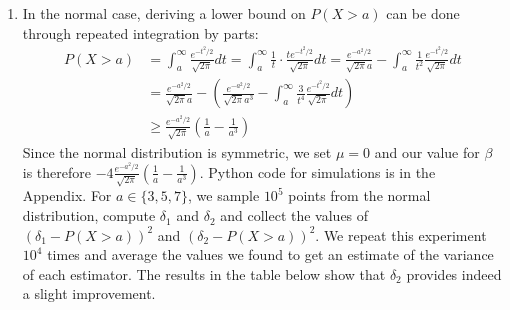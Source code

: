\documentclass[a4paper,11pt]{article}
\begin{document}
\begin{enumerate}[label=(\alph*)]
  \item In the normal case, deriving a lower bound on $P(X>a)$ can be done through repeated integration by parts: $$\begin{aligned}
    P(X>a)&= \int_a^\infty \frac{e^{-t^2/2}}{\sqrt{2 \pi}} dt = \int_a^\infty \frac 1t\cdot \frac{te^{-t^2/2}}{\sqrt{2 \pi}} dt = \frac{e^{-a^2/2}}{\sqrt{2 \pi}a} - \int_a^\infty \frac{1}{t^2} \frac{e^{-t^2/2}}{\sqrt{2 \pi}} dt\\
    &= \frac{e^{-a^2/2}}{\sqrt{2 \pi}a} - \left(\frac{e^{-a^2/2}}{\sqrt{2 \pi}a^3} -  \int_a^\infty \frac{3}{t^4} \frac{e^{-t^2/2}}{\sqrt{2 \pi}} dt\right)\\
    &\geq \frac{e^{-a^2/2}}{\sqrt{2 \pi}}\left(\frac 1a -\frac 1{a^3} \right)
  \end{aligned}$$
  Since the normal distribution is symmetric, we set $\mu = 0$ and our value for $\beta$ is therefore $\displaystyle -4\frac{e^{-a^2/2}}{\sqrt{2 \pi}}\left(\frac 1a -\frac 1{a^3} \right)$.\newline
  Python code for simulations is in the Appendix. For $a\in\{3,5,7\}$, we sample $10^5$ points from the normal distribution, compute $\delta_1$ and $\delta_2$ and collect the values of $(\delta_1-P(X>a))^2$ and $(\delta_2-P(X>a))^2$. We repeat this experiment $10^4$ times and average the values we found to get an estimate of the variance of each estimator. The results in the table below show that $\delta_2$ provides indeed a slight improvement.
\end{enumerate}
\end{document}
